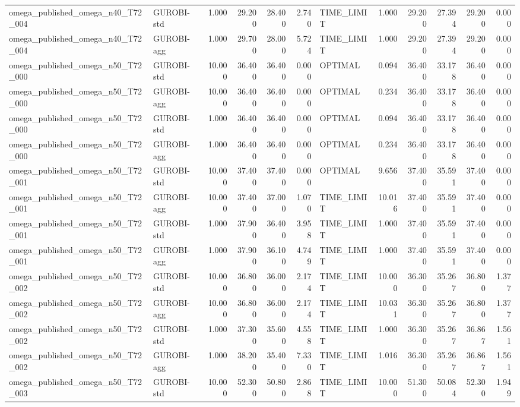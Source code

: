 \begin{table}[htbp]
\begin{tabular}{llrrrrlrrrrr}
omega\_published\_omega\_n40\_T72\_004 & GUROBI-std & 1.000 & 29.200 & 28.400 & 2.740 & TIME\_LIMIT & 1.000 & 29.200 & 27.394 & 29.200 & 0.000 \\
omega\_published\_omega\_n40\_T72\_004 & GUROBI-agg & 1.000 & 29.700 & 28.000 & 5.724 & TIME\_LIMIT & 1.000 & 29.200 & 27.394 & 29.200 & 0.000 \\
omega\_published\_omega\_n50\_T72\_000 & GUROBI-std & 10.000 & 36.400 & 36.400 & 0.000 & OPTIMAL & 0.094 & 36.400 & 33.178 & 36.400 & 0.000 \\
omega\_published\_omega\_n50\_T72\_000 & GUROBI-agg & 10.000 & 36.400 & 36.400 & 0.000 & OPTIMAL & 0.234 & 36.400 & 33.178 & 36.400 & 0.000 \\
omega\_published\_omega\_n50\_T72\_000 & GUROBI-std & 1.000 & 36.400 & 36.400 & 0.000 & OPTIMAL & 0.094 & 36.400 & 33.178 & 36.400 & 0.000 \\
omega\_published\_omega\_n50\_T72\_000 & GUROBI-agg & 1.000 & 36.400 & 36.400 & 0.000 & OPTIMAL & 0.234 & 36.400 & 33.178 & 36.400 & 0.000 \\
omega\_published\_omega\_n50\_T72\_001 & GUROBI-std & 10.000 & 37.400 & 37.400 & 0.000 & OPTIMAL & 9.656 & 37.400 & 35.591 & 37.400 & 0.000 \\
omega\_published\_omega\_n50\_T72\_001 & GUROBI-agg & 10.000 & 37.400 & 37.000 & 1.070 & TIME\_LIMIT & 10.016 & 37.400 & 35.591 & 37.400 & 0.000 \\
omega\_published\_omega\_n50\_T72\_001 & GUROBI-std & 1.000 & 37.900 & 36.400 & 3.958 & TIME\_LIMIT & 1.000 & 37.400 & 35.591 & 37.400 & 0.000 \\
omega\_published\_omega\_n50\_T72\_001 & GUROBI-agg & 1.000 & 37.900 & 36.100 & 4.749 & TIME\_LIMIT & 1.000 & 37.400 & 35.591 & 37.400 & 0.000 \\
omega\_published\_omega\_n50\_T72\_002 & GUROBI-std & 10.000 & 36.800 & 36.000 & 2.174 & TIME\_LIMIT & 10.000 & 36.300 & 35.267 & 36.800 & 1.377 \\
omega\_published\_omega\_n50\_T72\_002 & GUROBI-agg & 10.000 & 36.800 & 36.000 & 2.174 & TIME\_LIMIT & 10.031 & 36.300 & 35.267 & 36.800 & 1.377 \\
omega\_published\_omega\_n50\_T72\_002 & GUROBI-std & 1.000 & 37.300 & 35.600 & 4.558 & TIME\_LIMIT & 1.000 & 36.300 & 35.267 & 36.867 & 1.561 \\
omega\_published\_omega\_n50\_T72\_002 & GUROBI-agg & 1.000 & 38.200 & 35.400 & 7.330 & TIME\_LIMIT & 1.016 & 36.300 & 35.267 & 36.867 & 1.561 \\
omega\_published\_omega\_n50\_T72\_003 & GUROBI-std & 10.000 & 52.300 & 50.800 & 2.868 & TIME\_LIMIT & 10.000 & 51.300 & 50.084 & 52.300 & 1.949 \\

\end{tabular}
\end{table}
